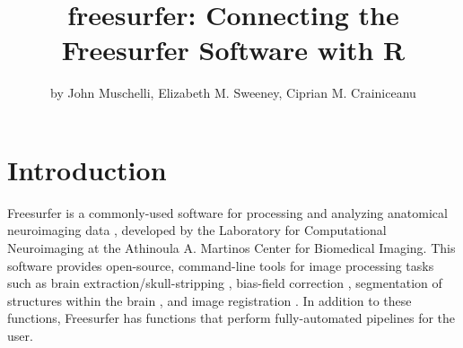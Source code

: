 \title{freesurfer: Connecting the Freesurfer Software with R}
\author{by John Muschelli, Elizabeth M. Sweeney, Ciprian M. Crainiceanu}

\maketitle


\section{Introduction}\label{introduction}

\label{sec:intro}

Freesurfer is a commonly-used software for processing and analyzing
anatomical neuroimaging data \citep{fischl2012freesurfer}, developed by
the Laboratory for Computational Neuroimaging at the Athinoula A.
Martinos Center for Biomedical Imaging. This software provides
open-source, command-line tools for image processing tasks such as brain
extraction/skull-stripping \citep{segonne2004hybrid}, bias-field
correction \citep{sled_nonparametric_1998}, segmentation of structures
within the brain \citep{fischl2002whole,fischl2004sequence}, and image
registration \citep{fischl1999high,reuter2010highly}. In addition to
these functions, Freesurfer has functions that perform fully-automated
pipelines for the user.

